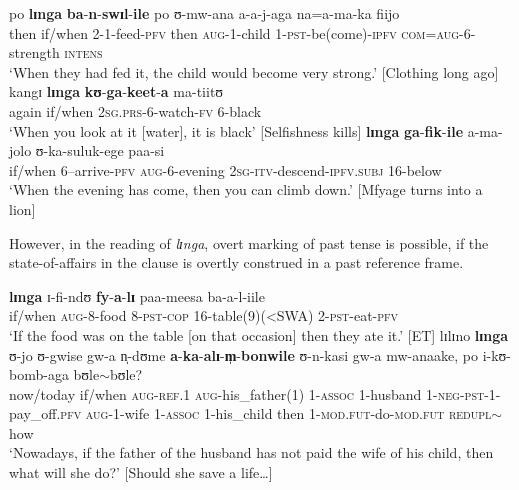 \begin{exe}
\ex \label{exLingaPSTGeneric}
\gll po \textbf{lɪnga} \textbf{ba}-\textbf{n}-\textbf{swɪl}-\textbf{ile} po ʊ-mw-ana a-a-j-aga na=a-ma-ka fiijo\\
then if/when 2-1-feed-\textsc{pfv} then \textsc{aug}-1-child 1-\textsc{pst}-be(come)-\textsc{ipfv} \textsc{com}=\textsc{aug}-6-strength \textsc{intens}\\
\glt \lq When they had fed it, the child would become very strong.' [Clothing long ago]
\ex \gll kangɪ \textbf{lɪnga} \textbf{kʊ}-\textbf{ga}-\textbf{keet}-\textbf{a} ma-tiitʊ\\
again if/when \textsc{2sg.prs}-6-watch-\textsc{fv} 6-black\\
\glt \lq When you look at it [water], it is black' [Selfishness kills]
\ex \gll \textbf{lɪnga} \textbf{ga}-\textbf{fik}-\textbf{ile} a-ma-jolo ʊ-ka-suluk-ege paa-si\\
if/when 6--arrive-\textsc{pfv} \textsc{aug}-6-evening \textsc{2sg}-\textsc{itv}-descend-\textsc{ipfv.subj} 16-below\\
\glt \lq ‎‎When the evening has come, then you can climb down.' [Mfyage turns into a lion]
\end{exe}

However, in the  reading of \textit{lɪnga}, overt marking of past tense is possible, if the state-of-affairs in the  clause is overtly construed in a past reference frame.

\begin{exe}
\ex \gll \textbf{lɪnga} ɪ-fi-ndʊ \textbf{fy}-\textbf{a}-\textbf{lɪ} paa-meesa ba-a-l-iile\\
if/when \textsc{aug}-8-food 8-\textsc{pst}-\textsc{cop} 16-table(9)(<SWA) 2-\textsc{pst}-eat-\textsc{pfv}\\
\glt \lq If the food was on the table [on that occasion] then they ate it.' [ET]
\ex \gll lɪlɪno \textbf{lɪnga} ʊ-jo ʊ-gwise gw-a n̩-dʊme \textbf{a}-\textbf{ka}-\textbf{alɪ}-\textbf{m̩}-\textbf{bonwile} ʊ-n-kasi gw-a mw-anaake, po i-kʊ-bomb-aga bʊle$\sim$bʊle?\\
now/today if/when \textsc{aug}-\textsc{ref.1} \textsc{aug}-his\_father(1) 1-\textsc{assoc} 1-husband 1-\textsc{neg}-\textsc{pst}-1-pay\_off.\textsc{pfv} \textsc{aug}-1-wife 1-\textsc{assoc} 1-his\_child then 1-\textsc{mod.fut}-do-\textsc{mod.fut} \textsc{redupl}$\sim$how\\
\glt `Nowadays, if the father of the husband has not paid the wife of his child, then what will she do?' [Should she save a life\ldots]
\end{exe}

